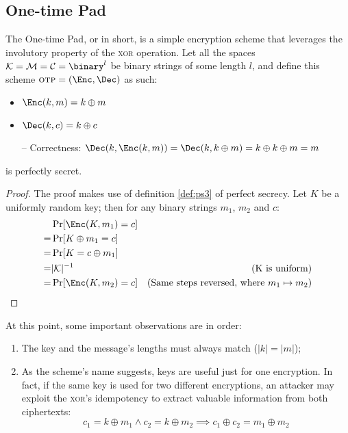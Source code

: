 \subsection{One-time Pad}

The One-time Pad, or \otp{} in short, is a simple encryption scheme that leverages the involutory property of the \textsc{xor} operation. Let all the spaces $\K = \M = \C = \binary^l$ be binary strings of some length $l$, and define this scheme $\otp = (\Enc, \Dec)$ as such:
\begin{itemize}
    \item $\Enc(k, m) = k \oplus m$
    \item $\Dec(k, c) = k \oplus c$
    \item[--] Correctness: $\Dec(k, \Enc(k, m)) = \Dec(k, k \oplus m) = k \oplus k \oplus m = m$
\end{itemize}

\begin{theorem}
    \otp{} is perfectly secret.
\end{theorem}
\begin{proof}
    The proof makes use of definition \ref{def:ps3} of perfect secrecy. Let $K$ be a uniformly random key; then for any binary strings $m_1$, $m_2$ and $c$:
    \begin{align*}
        & \Pr[\Enc(K, m_1) = c]     & \\
        =& \Pr[K \oplus m_1 = c]    & \\
        =& \Pr[K = c \oplus m_1]    & \\
        =& |\K|^{-1}                & \text{(K is uniform)} \\
        =& \Pr[\Enc(K, m_2) = c]    & \text{(Same steps reversed, where $m_1 \mapsto m_2$)}  
    \end{align*}
\end{proof}


At this point, some important observations are in order:
\begin{enumerate}
    \item The key and the message's lengths must always match ($|k| = |m|$);
    \item As the scheme's name suggests, keys are useful just for one encryption. In fact, if the same key is used for two different encryptions, an attacker may exploit the \textsc{xor}'s idempotency to extract valuable information from both ciphertexts:
    \[
        c_1 = k \oplus m_1 \wedge c_2 = k \oplus m_2 \implies c_1 \oplus c_2 = m_1 \oplus m_2
    \]

    
\end{enumerate}

